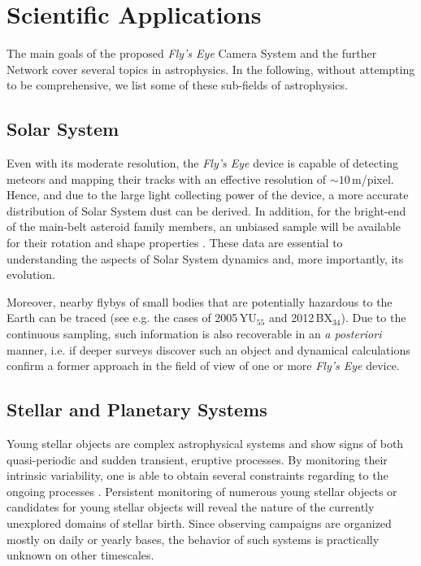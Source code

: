 \section{Scientific Applications}

The main goals of the proposed {\it Fly's Eye} Camera System and the further Network cover several topics in astrophysics. In the following, without attempting to be comprehensive, we list some of these sub-fields of astrophysics. 

\subsection{Solar System} 
Even with its moderate resolution, the {\it Fly's Eye} device is capable of detecting meteors and mapping their tracks with an effective resolution of $\sim10$\,m/pixel. Hence, and due to the large light collecting power of the device, a more accurate distribution of Solar System dust can be derived. In addition, for the bright-end of the main-belt asteroid family members, an unbiased sample will be available for their rotation and shape properties \citep[see also][]{durech2011}. These data are essential to understanding the aspects of Solar System dynamics and, more importantly, its evolution. 

Moreover, nearby flybys of small bodies that are potentially hazardous to the Earth can be traced (see e.g. the cases of 2005\,YU\ensuremath{_{55}} and 2012\,BX\ensuremath{_{34}}{}). Due to the continuous sampling, such information is also recoverable in an \emph{a posteriori} manner, i.e. if deeper surveys discover such an object and dynamical calculations confirm a former approach in the field of view of one or more {\it Fly's Eye} device.

\subsection{Stellar and Planetary Systems} 
Young stellar objects are complex astrophysical systems and show signs of both quasi-periodic and sudden  transient, eruptive processes. By monitoring their intrinsic variability, one is able to obtain several constraints regarding to the ongoing processes \citep{hartmann1996,abraham2009}. Persistent monitoring of numerous young stellar objects or candidates for young stellar objects will reveal the nature of the  currently unexplored domains of stellar birth. Since observing campaigns are organized mostly on daily or yearly bases, the behavior of such systems is practically unknown on other timescales. 

